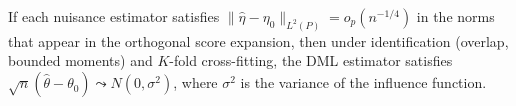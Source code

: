 


\begin{corollary}
\label{cor:dml}
If each nuisance estimator satisfies $\|\hat\eta - \eta_0\|_{L^2(P)} = o_p(n^{-1/4})$ in the norms that appear in the orthogonal score expansion, then under identification (overlap, bounded moments) and $K$-fold cross-fitting, the DML estimator satisfies $\sqrt{n}(\hat\theta - \theta_0) \leadsto N(0, \sigma^2)$, where $\sigma^2$ is the variance of the influence function.
\end{corollary}

